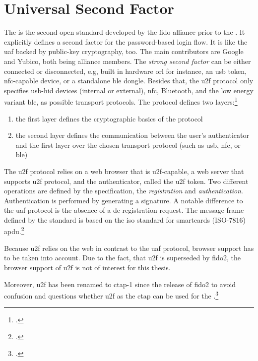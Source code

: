 \section{Universal Second Factor}

The  is the second open standard developed by the \gls{fido} alliance prior to the \wa. It explicitly defines a second factor for the password-based login flow. It is like the \gls{uaf} backed by public-key cryptography, too. The main contributors are Google and Yubico, both being alliance members. The \textit{strong second factor} can be either connected or disconnected, e.g, built in hardware orl for instance, an \gls{usb} token, \gls{nfc}-capable device, or a standalone \gls{ble} dongle. Besides that, the \gls{u2f} protocol only specifies \gls{usb}-\gls{hid} devices (internal or external), \gls{nfc}, Bluetooth, and the low energy variant \gls{ble}, as possible transport protocols. The protocol defines two layers:\footcites[See][4]{u2f-overview}[See][4]{u2f-js-api}

\begin{enumerate}
	\item the first layer defines the cryptographic basics of the protocol
	\item the second layer defines the communication between the user's authenticator and the first layer over the chosen transport protocol (such as \gls{usb}, \gls{nfc}, or \gls{ble})
\end{enumerate}

The \gls{u2f} protocol relies on a web browser that is \gls{u2f}-capable, a web server that supports \gls{u2f} protocol, and the authenticator, called the \gls{u2f} token. Two different operations are defined by the specification, the \textit{registration} and \textit{authentication}. Authentication is performed by generating a signature. A notable difference to the \gls{uaf} protocol is the absence of a de-registration request. The message frame defined by the standard is based on the \gls{iso} standard for smartcards (ISO-7816) \gls{apdu}.\footcites[See][3]{7860546}[See][3]{u2f-raw-message}

Because \gls{u2f} relies on the web in contrast to the \gls{uaf} protocol, browser support has to be taken into account. Due to the fact, that \gls{u2f} is superseded by \gls{fido}2, the browser support of \gls{u2f} is not of interest for this thesis.

Moreover, \gls{u2f} has been renamed to \gls{ctap}-1 since the release of \gls{fido}2 to avoid confusion and questions whether \gls{u2f} as the \gls{ctap} can be used for the \wa.\footcite[See][4]{ctap2}

